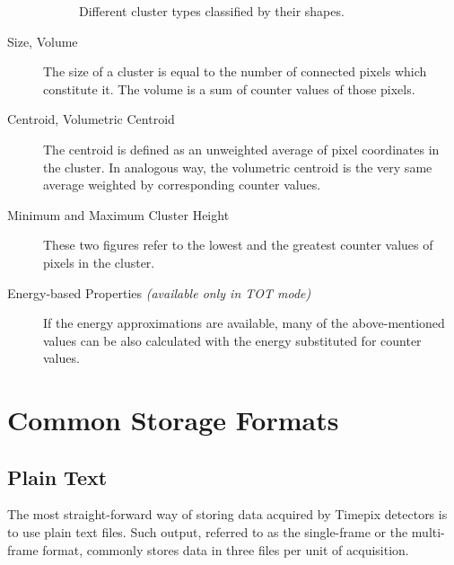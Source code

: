 \begin{description}
\begin{figure}[t]
\begin{center}
    \caption{Different cluster types classified by their shapes.}
    \label{fig:cluster-types}
    \end{center}
    \end{figure}

	\item[Size, Volume]
	The size of a cluster is equal to the number of connected pixels which constitute it. The volume is a sum of counter values of those pixels.

	\item[Centroid, Volumetric Centroid]
	The centroid is defined as an unweighted average of pixel coordinates in the cluster. In analogous way, the volumetric centroid is the very same average weighted by corresponding counter values. 

	\item[Minimum and Maximum Cluster Height]
	These two figures refer to the lowest and the greatest counter values of pixels in the cluster.

	\item[Energy-based Properties \textit{(available only in TOT mode)}]
	If the energy approximations are available, many of the above-mentioned values can be also calculated with the energy substituted for counter values.
\end{description}

\section{Common Storage Formats}
\label{db:storage-formats}

\subsection{Plain Text}
The most straight-forward way of storing data acquired by Timepix detectors is to use plain text files. Such output, referred to as the single-frame or the multi-frame format, commonly stores data in three files per unit of acquisition.

